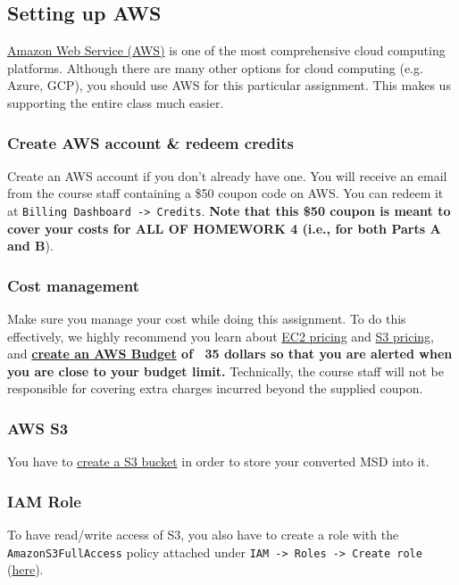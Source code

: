 \subsection{Setting up AWS}
\href{https://aws.amazon.com/}{Amazon Web Service (AWS)} is one of the most comprehensive cloud computing platforms. Although there are many other options for cloud computing (e.g. Azure, GCP), you should use AWS for this particular assignment. This makes us supporting the entire class much easier.
\subsubsection{Create AWS account \& redeem credits}
Create an AWS account if you don't already have one. You will receive an email from the course staff containing a \$50 coupon code on AWS. You can redeem it at \texttt{Billing Dashboard -> Credits}. \textbf{Note that this \$50 coupon is meant to cover your costs for ALL OF HOMEWORK 4 (i.e., for both Parts A and B}).
\subsubsection{Cost management}
Make sure you manage your cost while doing this assignment. To do this effectively, we highly recommend you learn about \href{https://aws.amazon.com/ec2/pricing/on-demand/}{EC2 pricing} and \href{https://aws.amazon.com/s3/pricing/}{S3 pricing}, and \textbf{ \href{https://docs.aws.amazon.com/awsaccountbilling/latest/aboutv2/budgets-create.html\#create-cost-budget}{create an AWS Budget} of ~35 dollars so that you are alerted when you are close to your budget limit.} Technically, the course staff will not be responsible for covering extra charges incurred beyond the supplied coupon.

\subsubsection{AWS S3}
You have to \href{https://docs.aws.amazon.com/AmazonS3/latest/userguide/create-bucket-overview.html}{create a S3 bucket} in order to store your converted MSD into it. 
\subsubsection{IAM Role}
To have read/write access of S3, you also have to create a role with the \texttt{AmazonS3FullAccess} policy attached under \texttt{IAM -> Roles -> Create role} (\href{https://console.aws.amazon.com/iam/home#/roles}{here}).

